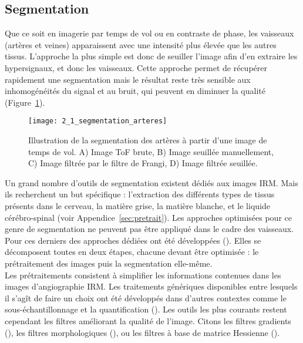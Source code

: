 \subsection{Segmentation}
Que ce soit en imagerie par temps de vol ou en contraste de phase, les vaisseaux (artères et veines) apparaissent avec une intensité plus élevée que les autres tissus. L’approche la plus simple est donc de seuiller l’image afin d’en extraire les hypersignaux, et donc les vaisseaux. Cette approche permet de récupérer rapidement une segmentation mais le résultat reste très sensible aux inhomogénéités du signal et au bruit, qui peuvent en diminuer la qualité (Figure~\ref{fig:2_1_segmentation_arteres}).\\
\begin{figure}[!t]
\centering
\texttt{[image: 2\_1\_segmentation\_arteres]}
\caption{Illustration de la segmentation des artères à partir d’une image de temps de vol. A) Image ToF brute, B) Image seuillée manuellement, C) Image filtrée par le filtre de Frangi, D) Image filtrée seuillée.}
\label{fig:2_1_segmentation_arteres}	
\end{figure}
Un grand nombre d’outils de segmentation existent dédiés aux images IRM. Mais ils recherchent un but spécifique : l’extraction des différents types de tissus présents dans le cerveau, la matière grise, la matière blanche, et le liquide cérébro-spinal (voir Appendice~\ref{sec:pretrait}).  Les approches optimisées pour ce genre de segmentation ne peuvent pas être appliqué dans le cadre des vaisseaux. Pour ces derniers des approches dédiées ont été développées (\cite{Lesage2009}). Elles se décomposent toutes en deux étapes, chacune devant être optimisée : le prétraitement des images puis la segmentation elle-même.\\
Les prétraitements consistent à simplifier les informations contenues dans les images d’angiographie IRM. Les traitements génériques disponibles entre lesquels il s’agît de faire un choix ont été développés dans d’autres contextes comme le sous-échantillonnage et la quantification (\cite{Tschirren2005}). Les outils les plus courants restent cependant les filtres améliorant la qualité de l’image. Citons les filtres gradients  (\cite{Koller1995}), les filtres morphologiques (\cite{Wilkinson2001}), ou les filtres à base de matrice Hessienne (\cite{Frangi1998}). \\
